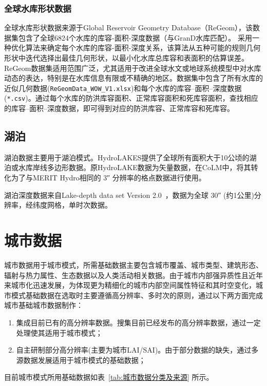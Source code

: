\subsubsection{全球水库形状数据}

全球水库形状数据来源于Global Reservoir Geometry Database（ReGeom），该数据集包含了全球6824个水库的库容-面积-深度数据（与GranD水库匹配）。\citet{yigzaw2018new} 采用一种优化算法来确定每个水库的库容-面积-深度关系，该算法从五种可能的规则几何形状中迭代选择出最佳几何形状，以最小化水库总库容和表面积的估算误差。ReGeom数据集适用范围广泛，尤其适用于改进全球水文或地球系统模型中对水库动态的表达，特别是在水库信息有限或不精确的地区。数据集中包含了所有水库的近似几何数据(\texttt{ReGeomData\_WOW\_V1.xlsx})和每个水库的库容--面积--深度数据(\texttt{*.csv})。通过每个水库的防洪库容面积、正常库容面积和死库容面积，查找相应的库容--面积--深度数据，即可得到对应的防洪库容、正常库容和死库容。


\subsection{湖泊}
湖泊数据主要用于湖泊模式。HydroLAKES提供了全球所有面积大于10公顷的湖泊或水库岸线多边形数据\citep{messager2016nc}。原HydroLAKE数据为矢量数据，在CoLM中，将其转化为了与MERIT Hydro相同的 \ang{;;3} 分辨率的格点数据进行使用。

湖泊深度数据来自Lake-depth data set Version 2.0~\citep{kourzeneva2012global}，数据为全球 \ang{;;30} (约1公里)分辨率，经纬度网格，单时次数据。


\section{城市数据}\label{城市数据}
城市数据用于城市模式，所需基础数据主要包含城市覆盖、城市类型、建筑形态、辐射与热力属性、生态数据以及人类活动相关数据。由于城市内部强异质性且近年来城市化迅速发展，为体现更为精细化的城市内部空间属性特征和其时空变化，城市模式基础数据在选取时主要遵循高分辨率、多时次的原则，通过以下两方面完成城市基础城市数据制作：

\begin{enumerate}
  \item 集成目前已有的高分辨率数据。搜集目前已经发布的高分辨率数据，通过一定处理使其适用于城市模式；
  \item 自主研制部分高分辨率(主要为城市LAI/SAI)。由于部分数据的缺失，通过多源数据发展适用于城市模式的基础数据；
\end{enumerate}
目前城市模式所用基础数据如表~\ref{tab:城市数据分类及来源} 所示。


